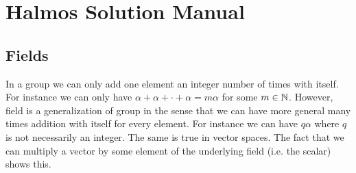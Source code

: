 \chapter{Halmos Solution Manual}


\section{Fields}

\begin{observation}
	In a group we can only add one element an integer number of times with itself. For instance we can only have $ \alpha + \alpha + \cdot + \alpha = m\alpha  $ for some $ m \in \mathbb{N} $. However, field is a generalization of group in the sense that we can have more general many times addition with itself for every element. For instance we can have $ q \alpha  $ where $ q $ is not necessarily an integer. The same is true in vector spaces. The fact that we can multiply a vector by some element of the underlying field (i.e. the scalar) shows this. 
\end{observation}


